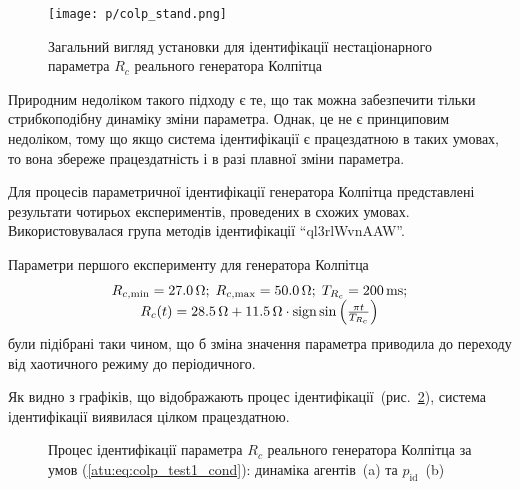 \begin{figure}[htb!]
  \centerline{
    \texttt{[image: p/colp\_stand.png]}
  }
\caption{Загальний вигляд установки для ідентифікації нестаціонарного параметра $ R_c $ реального генератора Колпітца}
\label{atu:f:colp_r_id_dev}
\end{figure}

Природним недоліком такого підходу є те, що так можна
забезпечити тільки стрибкоподібну динаміку зміни
параметра. Однак, це не є принциповим недоліком, тому що якщо
система ідентифікації є працездатною в таких умовах, то вона
збереже працездатність і в разі плавної зміни параметра.

Для процесів параметричної ідентифікації генератора Колпітца
представлені результати чотирьох експериментів, проведених в
схожих умовах. Використовувалася група методів ідентифікації
``ql3rlWvnAAW''.


Параметри першого експерименту для генератора Колпітца
%
\begin{equation}
  \begin{array}{c}
    R_{c,\min} = \SI{27.0}{\ohm};
    \;
    R_{c,\max} = \SI{50.0}{\ohm};
    \;
    T_{R_c} = \SI{200}{\milli\second};
  \\
    R_c(t) = \SI{28.5}{\ohm} + \SI{11.5}{\ohm} \cdot \operatorname*{sign} \sin \left(  \frac{\pi t}{T_{R_c}}  \right)
  \end{array}
  \label{atu:eq:colp_test1_cond}
\end{equation}
%
були підібрані таки чином, що б зміна значення параметра
приводила до переходу від хаотичного режиму до періодичного.

Як видно з графіків, що відображають процес
ідентифікації~(рис.~\ref{atu:f:colp_r_id_1}), система ідентифікації
виявилася цілком працездатною.


\begin{figure}[htb!]
  \caption{Процес ідентифікації параметра $ R_c $ реального генератора Колпітца за умов (\ref{atu:eq:colp_test1_cond}): динаміка агентів~(a) та $p_\mathrm{id}$~(b)}
  \label{atu:f:colp_r_id_1}
\end{figure}


